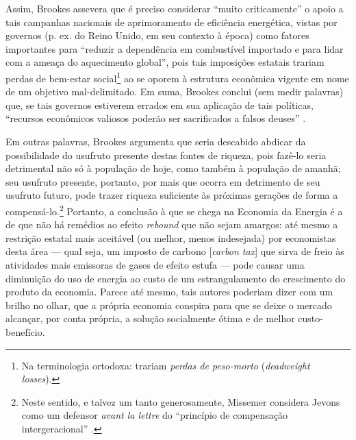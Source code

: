Assim, Brookes assevera que é preciso considerar ``muito criticamente'' o apoio a tais campanhas nacionais de aprimoramento de eficiência energética, vistas por governos (p. ex. do Reino Unido, em seu contexto à época) como fatores importantes para ``reduzir a dependência em combustível importado e para lidar com a ameaça do aquecimento global'', pois tais imposições estatais trariam perdas de bem-estar social\footnote{Na terminologia ortodoxa: trariam \textit{perdas de peso-morto} (\textit{deadweight losses}).} ao se oporem à estrutura econômica vigente em nome de um objetivo mal-delimitado. Em suma, Brookes conclui (sem medir palavras) que, se tais governos estiverem errados em sua aplicação de tais políticas, ``recursos econômicos valiosos poderão ser sacrificados a falsos deuses'' \parencite[p. 321]{Brookes1990}.

Em outras palavras, Brookes argumenta que seria descabido abdicar da possibilidade do usufruto presente destas fontes de riqueza, pois fazê-lo seria detrimental não só à população de hoje, como também à população de amanhã; seu usufruto presente, portanto, por mais que ocorra em detrimento de seu usufruto futuro, pode trazer riqueza suficiente às próximas gerações de forma a compensá-lo.\footnote{Neste sentido, e talvez um tanto generosamente, Missemer considera Jevons como um defensor \textit{avant la lettre} do ``princípio de compensação intergeracional'' \parencite[pp. 100-2]{Missemer2012}.} Portanto, a conclusão à que se chega na Economia da Energia é a de que não há remédios ao efeito \textit{rebound} que não sejam amargos: até mesmo a restrição estatal mais aceitável (ou melhor, menos indesejada) por economistas desta área --- qual seja, um imposto de carbono [\textit{carbon tax}] que sirva de freio às atividades mais emissoras de gases de efeito estufa --- pode causar uma diminuição do uso de energia ao custo de um estrangulamento do crescimento do produto da economia. Parece até mesmo, tais autores poderiam dizer com um brilho no olhar, que a própria economia conspira para que se deixe o mercado alcançar, por conta própria, a solução socialmente ótima e de melhor custo-benefício. 


